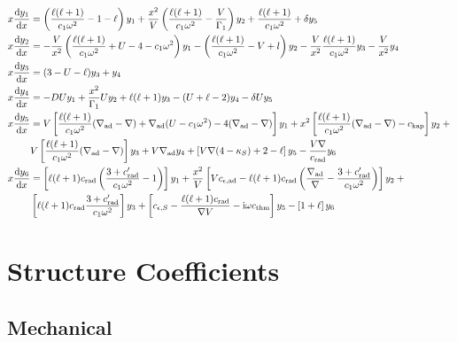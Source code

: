 \documentclass[fleqn]{article}
\newcommand{\diff}{\ensuremath{\mathrm{d}}}
\newcommand{\ii}{\ensuremath{\mathrm{i}}}
\newcommand{\Vg}{\ensuremath{\frac{V}{\Gamma_{1}}}}
\newcommand{\nabad}{\ensuremath{\nabla_{\rm ad}}}
\newcommand{\kapS}{\ensuremath{\kappa_{S}}}
\newcommand{\crad}{\ensuremath{c_{\rm rad}}}
\newcommand{\cepsad}{\ensuremath{c_{\epsilon,{\rm ad}}}}
\newcommand{\cepsS}{\ensuremath{c_{\epsilon,S}}}
\newcommand{\cthm}{\ensuremath{c_{\rm thm}}}
\newcommand{\ckap}{\ensuremath{c_{\rm kap}}}
\begin{document}
\begin{align*}
x \frac{\diff y_{1}}{\diff x} &=
\left(\frac{\ell(\ell+1)}{c_{1} \omega^{2}} - 1 - \ell \right) y_{1} +
\frac{x^{2}}{V} \left(\frac{\ell(\ell+1)}{c_{1} \omega^{2}} - \Vg \right) y_{2} +
\frac{\ell(\ell+1)}{c_{1} \omega^{2}} + \delta y_{5} \\
x \frac{\diff y_{2}}{\diff x} &=
-\frac{V}{x^{2}} \left( \frac{\ell(\ell+1)}{c_{1} \omega^{2}} + U - 4 - c_{1} \omega^{2} \right) y_{1} -
\left(\frac{\ell(\ell+1)}{c_{1} \omega^{2}} - V + l\right) y_{2} -
\frac{V}{x^{2}} \frac{\ell(\ell+1)}{c_{1} \omega^{2}} y_{3} -
\frac{V}{x^{2}} y_{4} \\
x \frac{\diff y_{3}}{\diff x} &=
(3 - U - \ell) y_{3} +
y_{4} \\
x \frac{\diff y_{4}}{\diff x} &=
- D U y_{1} +
\frac{x^{2}}{\Gamma_{1}} U y_{2} +
\ell(\ell+1) y_{3} -
(U + \ell - 2) y_{4} - \delta U y_{5} \\
x \frac{\diff y_{5}}{\diff x} &=
V \left[ \frac{\ell(\ell+1)}{c_{1} \omega^{2}} (\nabad - \nabla) + \nabad (U - c_{1}\omega^{2}) - 4 (\nabad - \nabla) \right] y_{1} + 
x^{2} \left[ \frac{\ell(\ell+1)}{c_{1} \omega^{2}} (\nabad - \nabla) - \ckap \right] y_{2} + \mbox{} \\
& 
V \left[ \frac{\ell(\ell+1)}{c_{1} \omega^{2}} (\nabad - \nabla) \right] y_{3} + 
V \nabad y_{4} + 
\left[ V \nabla (4 - \kapS) + 2 - \ell \right] y_{5} -
\frac{V \nabla}{\crad} y_{6} \\
x \frac{\diff y_{6}}{\diff x} &=
\left[ \ell(\ell+1) \crad \left( \frac{3 + \crad'}{c_{1}\omega^{2}} - 1 \right) \right] y_{1} +
\frac{x^{2}}{V} \left[ V \cepsad - \ell(\ell+1) \crad \left( \frac{\nabad}{\nabla} - \frac{3 + \crad'}{c_{1}\omega^{2}} \right) \right] y_{2} + \mbox{} \\
&
\left[ \ell(\ell+1) \crad \frac{3 + \crad'}{c_{1}\omega^{2}} \right] y_{3} +
\left[ \cepsS - \frac{\ell(\ell+1)\crad}{\nabla V} - \ii \omega \cthm\right] y_{5} -
\left[ 1 + \ell \right] y_{6}
\end{align*}


\newpage

\section*{Structure Coefficients}

\subsection*{Mechanical}
\end{document}
